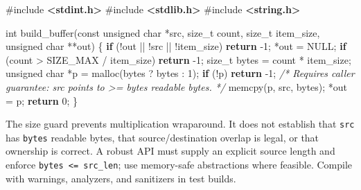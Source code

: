 \documentclass[
  letterpaper,
]{article}
\newenvironment{Shaded}{}{}
\newcommand{\CommentTok}[1]{\textcolor[rgb]{0.38,0.63,0.69}{\textit{#1}}}
\newcommand{\ControlFlowTok}[1]{\textcolor[rgb]{0.00,0.44,0.13}{\textbf{#1}}}
\newcommand{\DataTypeTok}[1]{\textcolor[rgb]{0.56,0.13,0.00}{#1}}
\newcommand{\DecValTok}[1]{\textcolor[rgb]{0.25,0.63,0.44}{#1}}
\newcommand{\ImportTok}[1]{\textcolor[rgb]{0.00,0.50,0.00}{\textbf{#1}}}
\newcommand{\NormalTok}[1]{#1}
\newcommand{\OperatorTok}[1]{\textcolor[rgb]{0.40,0.40,0.40}{#1}}
\newcommand{\PreprocessorTok}[1]{\textcolor[rgb]{0.74,0.48,0.00}{#1}}
\begin{document}
\begin{Shaded}
\begin{Highlighting}[]
\PreprocessorTok{\#include }\ImportTok{\textless{}stdint.h\textgreater{}}
\PreprocessorTok{\#include }\ImportTok{\textless{}stdlib.h\textgreater{}}
\PreprocessorTok{\#include }\ImportTok{\textless{}string.h\textgreater{}}

\DataTypeTok{int}\NormalTok{ build\_buffer}\OperatorTok{(}\DataTypeTok{const} \DataTypeTok{unsigned} \DataTypeTok{char} \OperatorTok{*}\NormalTok{src}\OperatorTok{,} \DataTypeTok{size\_t}\NormalTok{ count}\OperatorTok{,}
                 \DataTypeTok{size\_t}\NormalTok{ item\_size}\OperatorTok{,} \DataTypeTok{unsigned} \DataTypeTok{char} \OperatorTok{**}\NormalTok{out}\OperatorTok{)} \OperatorTok{\{}
    \ControlFlowTok{if} \OperatorTok{(!}\NormalTok{out }\OperatorTok{||} \OperatorTok{!}\NormalTok{src }\OperatorTok{||} \OperatorTok{!}\NormalTok{item\_size}\OperatorTok{)} \ControlFlowTok{return} \OperatorTok{{-}}\DecValTok{1}\OperatorTok{;}
    \OperatorTok{*}\NormalTok{out }\OperatorTok{=}\NormalTok{ NULL}\OperatorTok{;}
    \ControlFlowTok{if} \OperatorTok{(}\NormalTok{count }\OperatorTok{\textgreater{}}\NormalTok{ SIZE\_MAX }\OperatorTok{/}\NormalTok{ item\_size}\OperatorTok{)} \ControlFlowTok{return} \OperatorTok{{-}}\DecValTok{1}\OperatorTok{;}
    \DataTypeTok{size\_t}\NormalTok{ bytes }\OperatorTok{=}\NormalTok{ count }\OperatorTok{*}\NormalTok{ item\_size}\OperatorTok{;}
    \DataTypeTok{unsigned} \DataTypeTok{char} \OperatorTok{*}\NormalTok{p }\OperatorTok{=}\NormalTok{ malloc}\OperatorTok{(}\NormalTok{bytes }\OperatorTok{?}\NormalTok{ bytes }\OperatorTok{:} \DecValTok{1}\OperatorTok{);}
    \ControlFlowTok{if} \OperatorTok{(!}\NormalTok{p}\OperatorTok{)} \ControlFlowTok{return} \OperatorTok{{-}}\DecValTok{1}\OperatorTok{;}
    \CommentTok{/* Requires caller guarantee: src points to \textgreater{}= bytes readable bytes. */}
\NormalTok{    memcpy}\OperatorTok{(}\NormalTok{p}\OperatorTok{,}\NormalTok{ src}\OperatorTok{,}\NormalTok{ bytes}\OperatorTok{);}
    \OperatorTok{*}\NormalTok{out }\OperatorTok{=}\NormalTok{ p}\OperatorTok{;}
    \ControlFlowTok{return} \DecValTok{0}\OperatorTok{;}
\OperatorTok{\}}
\end{Highlighting}
\end{Shaded}

The size guard prevents multiplication wraparound. It does not establish
that \texttt{src} has \texttt{bytes} readable bytes, that
source/destination overlap is legal, or that ownership is correct. A
robust API must supply an explicit source length and enforce
\texttt{bytes\ \textless{}=\ src\_len}; use memory-safe abstractions
where feasible. Compile with warnings, analyzers, and sanitizers in test
builds.
\end{document}
